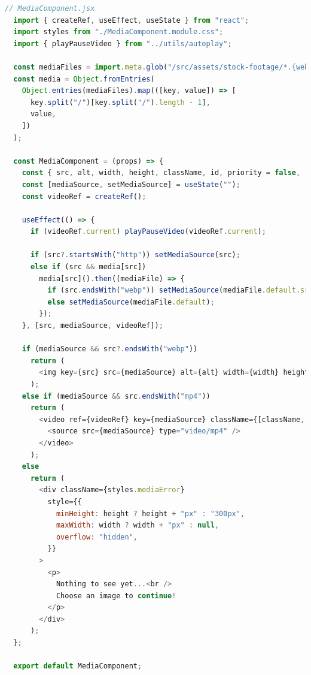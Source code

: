 \documentclass[a4paper, 10pt]{article}
\begin{document}
\begin{lstlisting}[caption=MediaComponent Astro Island with React, label={lst:AstroIsland:MediaComponent}, language=JavaScript]
  // MediaComponent.jsx
  import { createRef, useEffect, useState } from "react";
  import styles from "./MediaComponent.module.css";
  import { playPauseVideo } from "../utils/autoplay";
  
  const mediaFiles = import.meta.glob("/src/assets/stock-footage/*.{webp,mp4}");
  const media = Object.fromEntries(
    Object.entries(mediaFiles).map(([key, value]) => [
      key.split("/")[key.split("/").length - 1],
      value,
    ])
  );
  
  const MediaComponent = (props) => {
    const { src, alt, width, height, className, id, priority = false, ...rest } = props;
    const [mediaSource, setMediaSource] = useState("");
    const videoRef = createRef();
  
    useEffect(() => {
      if (videoRef.current) playPauseVideo(videoRef.current);
  
      if (src?.startsWith("http")) setMediaSource(src);
      else if (src && media[src])
        media[src]().then((mediaFile) => {
          if (src.endsWith("webp")) setMediaSource(mediaFile.default.src);
          else setMediaSource(mediaFile.default);
        });
    }, [src, mediaSource, videoRef]);
  
    if (mediaSource && src?.endsWith("webp"))
      return (
        <img key={src} src={mediaSource} alt={alt} width={width} height={height} className={[className, styles.postMedia].join(" ")} id={id} loading={priority ? "eager" : "lazy"} {...rest} />
      );
    else if (mediaSource && src.endsWith("mp4"))
      return (
        <video ref={videoRef} key={mediaSource} className={[className, styles.postMedia].join(" ")} id={id} width={width} preload="metadata" controls controlsList="nodownload,nofullscreen,noremoteplayback" disablePictureInPicture loop muted >
          <source src={mediaSource} type="video/mp4" />
        </video>
      );
    else
      return (
        <div className={styles.mediaError}
          style={{
            minHeight: height ? height + "px" : "300px",
            maxWidth: width ? width + "px" : null,
            overflow: "hidden",
          }}
        >
          <p>
            Nothing to see yet...<br />
            Choose an image to continue!
          </p>
        </div>
      );
  };
  
  export default MediaComponent;
\end{lstlisting}
\end{document}
